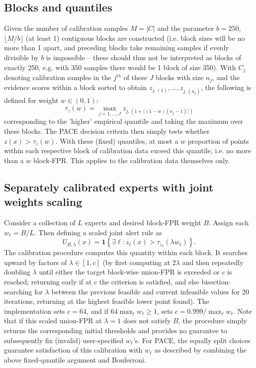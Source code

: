 \subsection{Blocks and quantiles} 
Given the number of calibration samples $M = |C|$ and the parameter $b=250$, $\lfloor M/b\rfloor$ (at least 1) contiguous blocks are constructed (i.e. block sizes will be no more than 1 apart, and preceding blocks take remaining samples if evenly divisible by $b$ is impossible -- these should thus not be interpreted as blocks of exactly 250, e.g. with 350 samples there would be 1 block of size 350). With $C_j$ denoting calibration samples in the $j^{th}$ of these $J$ blocks with size $n_j$, and the evidence scores within a block sorted to obtain $z_{j,(1)},...,z_{j,(n_j)}$, the following is defined for weight $w\in (0,1)$:
\begin{equation} 
\tau_z(w) = \max_{j = 1,..., J} z_{j, (1+\lceil(1-w)(n_j-1)\rceil)} 
\label{eq:threshold} 
\end{equation} 
corresponding to the 'higher' empirical quantile and taking the maximum over these blocks. The PACE decision criteria then simply tests whether $z(x) > \tau_z(w)$. With these (fixed) quantiles, at most a $w$ proportion of points within each respective block of calibration data exceed this quantile, i.e. no more than a $w$ block-FPR. This applies to the calibration data themselves only.

\subsection{Separately calibrated experts with joint weights scaling} 
Consider a collection of $L$ experts and desired block-FPR weight $B$. Assign each $w_{\ell}= B/L$. Then defining a scaled joint alert rule as
\begin{equation}
 U_{B,\lambda}(x)=\mathbf{1}\!\left\{\exists\ell:
 z_\ell(x)>\tau_{z_\ell}(\lambda w_\ell)\right\}.
 \label{eq:union}
\end{equation}
The calibration procedure computes this quantity within each block. It searches upward by factors of $\lambda \in [1,c]$ (by first computing at $2\lambda$ and then repeatedly doubling $\lambda$ until either the target block-wise union-FPR is exceeded or $c$ is reached; returning early if at $c$ the criterion is satisfied, and else bisection-searching for $\lambda$ between the previous feasible and current infeasible values for 20 iterations, returning at the highest feasible lower point found). The implementation sets $c=64$, and if $64 \max_{\ell} w_{\ell} \ge 1$, sets $c = 0.999/\max_{\ell} w_{\ell}$. Note that if this scaled union-FPR at $\lambda=1$ does not satisfy $B$, the procedure simply returns the corresponding initial thresholds and provides no guarantee to subsequently fix (invalid) user-specified $w_\ell$'s. For PACE, the equally split choices guarantee satisfaction of this calibration with $w_\ell$ as described by combining the above fixed-quantile argument and Bonferroni.

